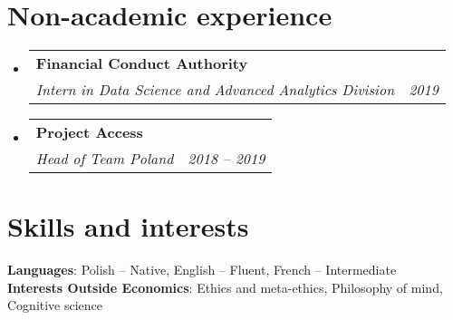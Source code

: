 \documentclass[letterpaper,11pt]{article}
\makeatletter
\newcommand{\resumeSubheading}[3]{
  \vspace{-2pt}\item
    \begin{tabular*}{0.97\textwidth}[t]{l@{\extracolsep{\fill}}r}
      \textbf{#1} \\
      \textit{\small#2} & \textit{\small #3} \\
    \end{tabular*}\vspace{-7pt}
}
\newcommand{\resumeSubHeadingListStart}{\begin{itemize}[leftmargin=0.15in, label={}]}
\newcommand{\resumeSubHeadingListEnd}{\end{itemize}}
\makeatother
\begin{document}
  \vspace{0.15cm}

\section{Non-academic experience}
  \resumeSubHeadingListStart
      \resumeSubheading
      {Financial Conduct Authority}
      {Intern in Data Science and Advanced Analytics Division}{2019}
    \resumeSubheading
      {Project Access}
      {Head of Team Poland}{2018 -- 2019}
  \resumeSubHeadingListEnd

\vspace{0.15cm}


\section{Skills and interests}
 \begin{itemize}[leftmargin=0.15in, label={}]
    \small{\item{
     \textbf{Languages}{: Polish -- Native, English -- Fluent, French -- Intermediate} \\
     \textbf{Interests Outside Economics}{: Ethics and meta-ethics, Philosophy of mind, Cognitive science} \\
    }}
    
 \end{itemize}
 
    
\end{document}
